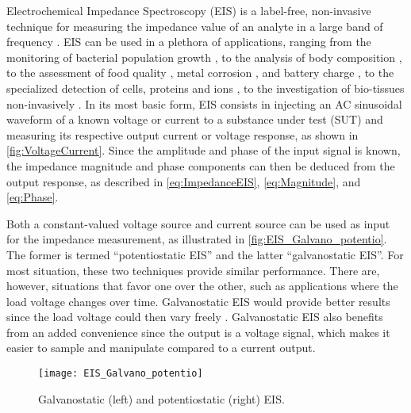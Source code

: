 Electrochemical Impedance Spectroscopy (EIS) is a label-free, non-invasive technique for measuring the impedance value of an analyte in a large band of frequency \cite{Grossi2017,Sawhney2019}. EIS can be used in a plethora of applications, ranging from the monitoring of bacterial population growth \cite{Grossi2009}, to the analysis of body composition \cite{Jaffrin2008}, to the assessment of food quality \cite{Grossi2017}, metal corrosion \cite{McIntyre1996}, and battery charge \cite{diard1998eis}, to the specialized detection of cells, proteins and ions \cite{Xu2016}, to the investigation of bio-tissues non-invasively \cite{Zhang2018}. In its most basic form, EIS consists in injecting an AC sinusoidal waveform of a known voltage or current to a substance under test (SUT) and measuring its respective output current or voltage response, as shown in \autoref{fig:VoltageCurrent}. Since the amplitude and phase of the input signal is known, the impedance magnitude and phase components can then be deduced from the output response, as described in \autoref{eq:ImpedanceEIS}, \autoref{eq:Magnitude}, and \autoref{eq:Phase}. \par

Both a constant-valued voltage source and current source can be used as input for the impedance measurement, as illustrated in \autoref{fig:EIS_Galvano_potentio}. The former is termed “potentiostatic EIS” and the latter “galvanostatic EIS”. For most situation, these two techniques provide similar performance. There are, however, situations that favor one over the other, such as applications where the load voltage changes over time. Galvanostatic EIS would provide better results since the load voltage could then vary freely \cite{Grossi2017,Rajabzadeh2019EIS}. Galvanostatic EIS also benefits from an added convenience since the output is a voltage signal, which makes it easier to sample and manipulate compared to a current output.  \par
\begin{figure}[ht]
    \centering
    \texttt{[image: EIS\_Galvano\_potentio]}
    \caption{Galvanostatic (left) and potentiostatic (right) EIS.}
    \label{fig:EIS_Galvano_potentio}
\end{figure}

